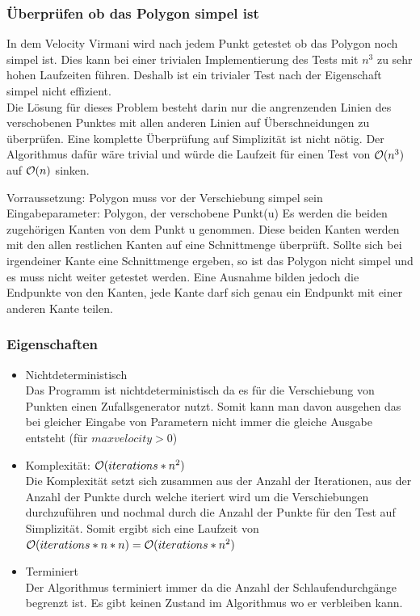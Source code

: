   \subsubsection{Überprüfen ob das Polygon simpel ist}
    In dem Velocity Virmani wird nach jedem Punkt getestet ob das Polygon 
    noch simpel ist. Dies kann bei einer trivialen Implementierung des 
    Tests mit $n^3$ zu sehr hohen Laufzeiten führen.
    Deshalb ist ein trivialer Test nach der Eigenschaft simpel nicht 
    effizient.\smallskip \\ 
    Die Lösung für dieses Problem besteht darin nur die angrenzenden 
    Linien des verschobenen Punktes mit allen anderen Linien auf 
    Überschneidungen zu überprüfen. Eine komplette Überprüfung auf 
    Simplizität ist nicht nötig.
    Der Algorithmus dafür wäre trivial und würde die Laufzeit für einen 
    Test von $\mathcal{O}(n^3)$ auf $\mathcal{O}(n)$ sinken.

    Vorraussetzung: Polygon muss vor der Verschiebung simpel sein
    Eingabeparameter: Polygon, der verschobene Punkt(u)
    Es werden die beiden zugehörigen Kanten von dem Punkt u genommen. 
    Diese beiden Kanten werden mit den allen restlichen Kanten auf eine 
    Schnittmenge überprüft. Sollte sich bei irgendeiner Kante eine 
    Schnittmenge ergeben, so ist das Polygon nicht simpel und es muss 
    nicht weiter getestet werden. Eine Ausnahme bilden jedoch die 
    Endpunkte von den Kanten, jede Kante darf sich genau ein Endpunkt mit 
    einer anderen Kante teilen.


  \subsubsection{Eigenschaften}
    \begin{itemize}
      \item Nichtdeterministisch\\
      Das Programm ist nichtdeterministisch da es für die Verschiebung 
      von Punkten einen Zufallsgenerator nutzt. Somit kann man davon 
      ausgehen das bei gleicher Eingabe von Parametern nicht immer die 
      gleiche Ausgabe entsteht (für $maxvelocity > 0$)
      \item Komplexität: $\mathcal{O}(iterations*n^2)$\\
      Die Komplexität setzt sich zusammen aus der Anzahl der 
      Iterationen, aus der Anzahl der Punkte durch welche iteriert wird 
      um die Verschiebungen durchzuführen und nochmal durch die Anzahl 
      der Punkte für den Test auf Simplizität. Somit ergibt sich eine 
      Laufzeit von $\mathcal{O}(iterations*n*n) = \mathcal{O}(iterations*n^2)$
      \item Terminiert\\
      Der Algorithmus terminiert immer da die Anzahl der 
      Schlaufendurchgänge begrenzt ist. Es gibt keinen Zustand im 
      Algorithmus wo er verbleiben kann.
    \end{itemize}


